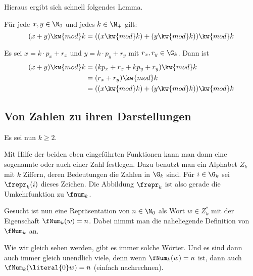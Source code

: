 Hieraus ergibt sich schnell folgendes Lemma.

\begin{lemma}
  Für jede $x,y\in\N_0$ und jedes $k\in\N_+$ gilt:
  \[
    (x+y)\kw{ mod }k = ((x \kw{ mod }k) + (y\kw{ mod }k)) \kw{ mod }k
  \]
\end{lemma}

\begin{beweis}
  Es sei $x=k\cdot p_x + r_x$
  und $y=k\cdot p_y + r_y$ mit $r_x,r_y\in\G_k$. Dann ist 
  \begin{align*}
    (x+y)\kw{ mod }k &= (k p_x + r_x + kp_y + r_y)\kw{ mod }k\\
                     &= (r_x + r_y)\kw{ mod }k \\
                     &= ((x \kw{ mod }k) + (y\kw{ mod }k)) \kw{ mod }k
  \end{align*}
\end{beweis}


\Tut\subsection{Von Zahlen zu ihren Darstellungen}

Es sei nun $k\geq 2$.

Mit Hilfe der beiden eben eingeführten Funktionen kann man dann eine
sogenannte  oder auch
 einer Zahl
festlegen.
%
Dazu benutzt man ein Alphabet $Z_k$
mit $k$ Ziffern, deren Bedeutungen die Zahlen in $\G_k$ sind.
%
Für $i\in\G_k$ sei $\frepr_k(i)$ dieses Zeichen.
%
Die Abbildung $\frepr_k$
ist also gerade die Umkehrfunktion zu $\fnum_k$.

Gesucht ist nun eine Repräsentation von $n\in\N_0$ als Wort $w\in
Z^*_k$ mit der Eigenschaft $\fNum_k(w)=n$. Dabei nimmt man die
naheliegende Definition von $\fNum_k$ an.

Wie wir gleich sehen werden, gibt es immer solche Wörter. Und es sind
dann auch immer gleich unendlich viele, denn wenn $\fNum_k(w)=n$ ist,
dann auch $\fNum_k(\literal{0}w)=n$ (einfach nachrechnen). 

